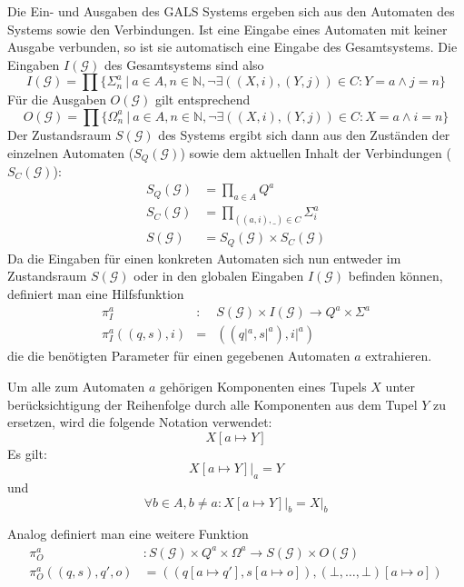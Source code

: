 Die Ein- und Ausgaben des GALS Systems ergeben sich aus den Automaten des Systems sowie den Verbindungen.
Ist eine Eingabe eines Automaten mit keiner Ausgabe verbunden, so ist sie automatisch eine Eingabe des Gesamtsystems.
Die Eingaben $I(\mathcal{G})$ des Gesamtsystems sind also
\[ I(\mathcal{G}) = \prod \{ \Sigma^a_n\ |\ a\in A, n\in \mathbb{N}, \lnot\exists ((X,i),(Y,j))\in C: Y=a\land j=n \} \]
Für die Ausgaben $O(\mathcal{G})$ gilt entsprechend
\[ O(\mathcal{G}) = \prod \{ \Omega^a_n\ |\ a\in A, n\in \mathbb{N}, \lnot\exists ((X,i),(Y,j))\in C: X=a\land i=n \} \]
Der Zustandsraum $S(\mathcal{G})$ des Systems ergibt sich dann aus den Zuständen der einzelnen Automaten ($S_Q(\mathcal{G})$) sowie dem aktuellen Inhalt der Verbindungen ($S_C(\mathcal{G})$):
\begin{align*}
  S_Q(\mathcal{G}) &= \prod_{a\in A} Q^a\\
  S_C(\mathcal{G}) &= \prod_{((a,i),\_)\in C} \Sigma^a_i\\
  S(\mathcal{G}) &= S_Q(\mathcal{G})\times S_C(\mathcal{G})
\end{align*}
Da die Eingaben für einen konkreten Automaten sich nun entweder im Zustandsraum $S(\mathcal{G})$ oder in den globalen Eingaben $I(\mathcal{G})$ befinden können, definiert man eine Hilfsfunktion 
\begin{eqnarray*}
  \pi_I^a &:& S(\mathcal{G})\times I(\mathcal{G})\rightarrow Q^a\times\Sigma^a\\
  \pi_I^a((q,s),i) &=& ((q|^a,s|^a),i|^a)
\end{eqnarray*}
die die benötigten Parameter für einen gegebenen Automaten $a$ extrahieren.
\begin{notation}
  Um alle zum Automaten $a$ gehörigen Komponenten eines Tupels $X$ unter berücksichtigung der Reihenfolge durch alle Komponenten aus dem Tupel $Y$ zu ersetzen, wird die folgende Notation verwendet:
  \[ X[a\mapsto Y] \]
  Es gilt:
  \[ \left.X[a\mapsto Y]\right|_a = Y \]
  und
  \[ \forall b\in A,b\neq a: \left.X[a\mapsto Y]\right|_b = X|_b \]
\end{notation}
Analog definiert man eine weitere Funktion 
\begin{align*}
  \pi_O^a &: S(\mathcal{G})\times Q^a\times\Omega^a\rightarrow S(\mathcal{G})\times O(\mathcal{G})\\
  \pi_O^a ((q,s),q',o) &= ((q[a\mapsto q'],s[a\mapsto o]),(\bot,\dots,\bot)[a\mapsto o])
\end{align*}
